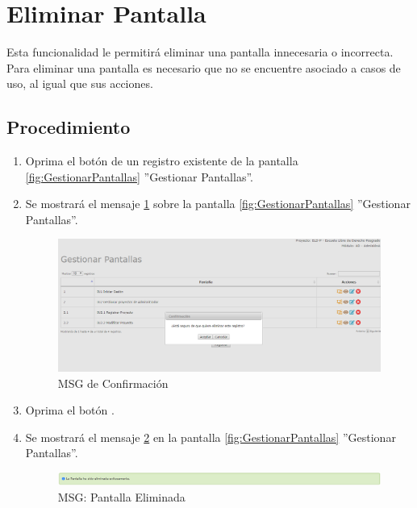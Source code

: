 \hypertarget{cv:eliminarPantalla}{\section{Eliminar Pantalla}} \label{sec:eliminarPantalla}

	Esta funcionalidad le permitirá eliminar una pantalla innecesaria o incorrecta. Para eliminar una pantalla es necesario que no se encuentre asociado a casos de uso, al igual que sus acciones.

		\subsection{Procedimiento}

			\begin{enumerate}
	
			\item Oprima el botón \IUBotonEliminar{} de un registro existente de la pantalla \ref{fig:GestionarPantallas} ''Gestionar Pantallas''.
	
			\item Se mostrará el mensaje \ref{fig:confirmaEliminaPantalla} sobre la pantalla \ref{fig:GestionarPantallas} ''Gestionar Pantallas''.
			
			\begin{figure}[htbp!]
				\begin{center}
					\includegraphics[scale=0.5]{roles/lider/pantallas/pantallas/IU11-3MSG10}
					\caption{MSG de Confirmación}
					\label{fig:confirmaEliminaPantalla}
				\end{center}
			\end{figure}
						
			\item Oprima el botón \IUAceptar.
			
			\item Se mostrará el mensaje \ref{fig:pantallaEliminada} en la pantalla \ref{fig:GestionarPantallas} ''Gestionar Pantallas''.
			
			\begin{figure}[htbp!]
				\begin{center}
					\includegraphics[scale=0.5]{roles/lider/pantallas/pantallas/IU11-3MSG1}
					\caption{MSG: Pantalla Eliminada}
					\label{fig:pantallaEliminada}
				\end{center}
			\end{figure}
			\end{enumerate}